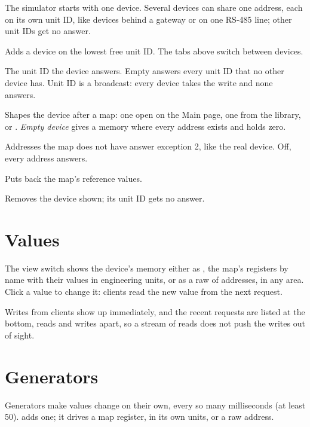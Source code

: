 The simulator starts with one device. Several devices can share one address,
each on its own unit ID, like devices behind a gateway or on one RS-485 line;
other unit IDs get no answer.

\begin{description}[style=nextline, leftmargin=0pt, font=\intermedium]
  \item[\ui{Add device}] Adds a device on the lowest free unit ID. The tabs
    above switch between devices.
  \item[\field{Unit ID}] The unit ID the device answers. Empty answers every
    unit ID that no other device has. Unit ID  is a broadcast: every
    device takes the write and none answers.
  \item[\field{Map}] Shapes the device after a map: one open on the Main page,
    one from the library, or . \emph{Empty device}
    gives a memory where every address exists and holds zero.
  \item[\field{Only the map's addresses}] Addresses the map does not have
    answer exception 2, like the real device. Off, every address answers.
  \item[\ui{Reset values}] Puts back the map's reference values.
  \item[\ui{Remove device}] Removes the device shown; its unit ID gets no
    answer.
\end{description}

\section{Values}

The view switch shows the device's memory either as , the map's
registers by name with their values in engineering units, or as a raw
 of addresses, in any area. Click a value to change it: clients
read the new value from the next request.

Writes from clients show up immediately, and the recent requests are listed
at the bottom, reads and writes apart, so a stream of reads does not push the
writes out of sight.

\section{Generators}

Generators make values change on their own, every so many milliseconds (at
least 50).  adds one; it drives a map register, in its own
units, or a raw address.

